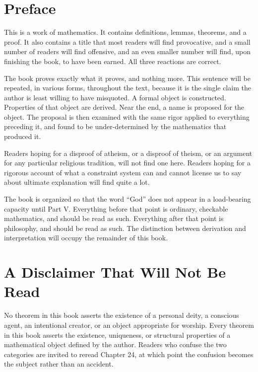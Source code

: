 \documentclass[11pt]{book}
\begin{document}
\chapter*{Preface}

This is a work of mathematics. It contains definitions, lemmas, theorems, and a proof. It also contains a title that most readers will find provocative, and a small number of readers will find offensive, and an even smaller number will find, upon finishing the book, to have been earned. All three reactions are correct.

The book proves exactly what it proves, and nothing more. This sentence will be repeated, in various forms, throughout the text, because it is the single claim the author is least willing to have misquoted. A formal object is constructed. Properties of that object are derived. Near the end, a name is proposed for the object. The proposal is then examined with the same rigor applied to everything preceding it, and found to be under-determined by the mathematics that produced it.

Readers hoping for a disproof of atheism, or a disproof of theism, or an argument for any particular religious tradition, will not find one here. Readers hoping for a rigorous account of what a constraint system can and cannot license us to say about ultimate explanation will find quite a lot.

The book is organized so that the word ``God'' does not appear in a load-bearing capacity until Part V. Everything before that point is ordinary, checkable mathematics, and should be read as such. Everything after that point is philosophy, and should be read as such. The distinction between derivation and interpretation will occupy the remainder of this book.

\chapter*{A Disclaimer That Will Not Be Read}

No theorem in this book asserts the existence of a personal deity, a conscious agent, an intentional creator, or an object appropriate for worship. Every theorem in this book asserts the existence, uniqueness, or structural properties of a mathematical object defined by the author. Readers who confuse the two categories are invited to reread Chapter 24, at which point the confusion becomes the subject rather than an accident.
\end{document}
